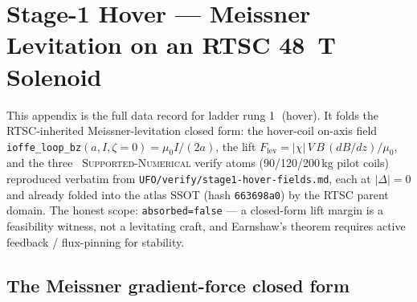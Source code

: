 \section{Stage-1 Hover --- Meissner Levitation on an RTSC \SI{48}{\tesla} Solenoid}
\label{app:stage1}

This appendix is the full data record for ladder rung
\textcircled{\scriptsize 1} (hover). It folds the RTSC-inherited
Meissner-levitation closed form: the hover-coil on-axis field
\verb|ioffe_loop_bz|$(a,I,\zeta\!=\!0)=\mu_0 I/(2a)$, the lift
$F_{\text{lev}}=|\chi|\,V\,B\,(dB/dz)/\mu_0$, and the three \tierGreen\
\textsc{Supported-Numerical} verify atoms (90/120/200\,kg pilot coils)
reproduced verbatim from \texttt{UFO/verify/stage1-hover-fields.md},
each at $|\Delta|=0$ and already folded into the atlas SSOT (hash
\texttt{663698a0}) by the RTSC parent domain. The honest scope:
\texttt{absorbed=false} --- a closed-form lift margin is a feasibility
witness, not a levitating craft, and Earnshaw's theorem
\citep{earnshaw1842} requires active feedback / flux-pinning for
stability.

\subsection{The Meissner gradient-force closed form}
\label{app:stage1-deriv}


